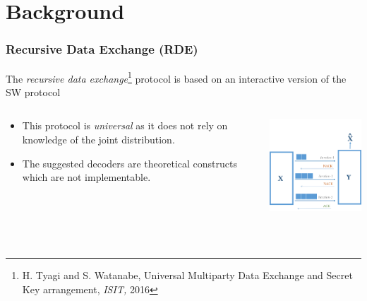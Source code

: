 \documentclass[xcolor=dvipsnames]{beamer}
\begin{document}
\section{Background}

\begin{frame}[label = rde]
\frametitle{Recursive Data Exchange (RDE)}
The \emph{recursive data exchange}\footnote{\tiny H. Tyagi and S. Watanabe, Universal Multiparty Data Exchange and Secret Key arrangement, \textit{ISIT,} 2016} protocol is based on an interactive version of the SW protocol
\begin{minipage}[0.9\textheight]{\textwidth}
\begin{columns}
\begin{column}{0.4\textwidth}
\begin{itemize}
\item This protocol is \emph{universal} as it does not rely on knowledge of the joint distribution.
\item The suggested decoders are theoretical constructs which are not implementable.
\end{itemize}
\end{column}
\begin{column}{0.5\textwidth}
\includegraphics[width=5.2cm]{./rde.png}
\end{column}
\end{columns}
\end{minipage}\\
\end{frame}
\end{document}
